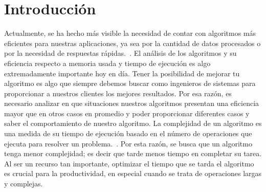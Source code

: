 
\section{Introducción} %
Actualmente, se ha hecho más visible la necesidad de contar con algoritmos más eficientes para nuestras aplicaciones, ya sea por la cantidad de datos procesados o por la necesidad de respuestas rápidas.~\cite{brendomatos}. El análisis de los algoritmos y su eficiencia respecto a memoria usada y tiempo de ejecución es algo extremadamente importante hoy en día. Tener la posibilidad de mejorar tu algoritmo es algo que siempre debemos buscar como ingenieros de sistemas para proporcionar a nuestros clientes los mejores resultados. Por esa razón, es necesario analizar en que situaciones nuestros algoritmos presentan una eficiencia mayor que en otros casos en promedio y poder proporcionar diferentes casos y saber el comportamiento de nuestro algoritmo. La complejidad de un algoritmo es una medida de su tiempo de ejecución basado en el número de operaciones que ejecuta para resolver un problema.~\cite{Cormen2009}. Por esta razón, se busca que un algoritmo tenga menor complejidad; es decir que tarde menos tiempo en completar su tarea. Al ser un recurso tan importante, optimizar el tiempo que se tarda el algoritmo es crucial para la productividad, en especial cuando se trata de operaciones largas y complejas. 
